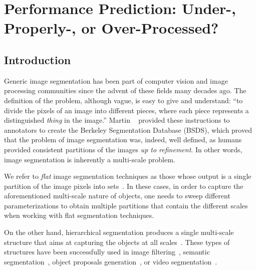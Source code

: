 \chapter{Performance Prediction: Under-, Properly-, or Over-Processed?}
\label{ch:scale-aware}

\section{Introduction}
\label{sec:intro}
Generic image segmentation has been part of computer vision and image processing communities since the
advent of these fields many decades ago.
The definition of the problem, although vague, is easy to give and understand: ``to divide the pixels of an
image into different pieces, where each piece represents a distinguished \textit{thing}
in the image.''
Martin \etal~\cite{Martin2001} provided these instructions to annotators to create
the Berkeley Segmentation Database (BSDS), which proved that the problem of image segmentation was,
indeed, well defined, as humans provided consistent partitions of the images \textit{up to refinement}.
In other words, image segmentation is inherently a multi-scale problem.

We refer to \textit{flat} image segmentation techniques as those whose output is a single partition of the
image pixels into sets~\cite{shi2000normalized,Comaniciu2002,felzenszwalb2004efficient}.
In these cases, in order to capture the aforementioned multi-scale nature of objects,
one needs to sweep different parameterizations to obtain multiple partitions that contain the
different scales when working with flat segmentation techniques.

On the other hand, hierarchical segmentation produces a single multi-scale structure that aims
at capturing the objects at all scales~\cite{arbelaez2011contour,kim2013learning,Salembier2000,Ren2013,arbelaez2014multiscale}. 
These types of structures have been successfully used in image filtering~\cite{Salembier2000},
semantic segmentation~\cite{Lempitsky2011}, object proposals generation~\cite{arbelaez2014multiscale},
or video segmentation~\cite{xu2013flattening,Varas2015}.

